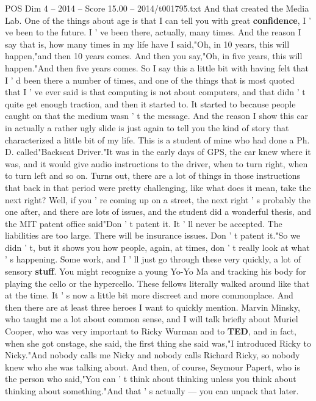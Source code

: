 \begin{textsample}{POS Dim 4 – 2014 – Score 15.00 – 2014/t001795.txt}
And that created the Media Lab.
One of the things about age is that I can tell you with great \textbf{confidence}, I ' ve been to the future.
I ' ve been there, actually, many times.
And the reason I say that is, how many times in my life have I said,"Oh, in 10 years, this will happen,"and then 10 years comes.
And then you say,"Oh, in five years, this will happen."And then five years comes.
So I say this a little bit with having felt that I ' d been there a number of times, and one of the things that is most quoted that I ' ve ever said is that computing is not about computers, and that didn ' t quite get enough traction, and then it started to.
It started to because people caught on that the medium wasn ' t the message.
And the reason I show this car in actually a rather ugly slide is just again to tell you the kind of story that characterized a little bit of my life.
This is a student of mine who had done a Ph.
D. called"Backseat Driver."It was in the early days of GPS, the car knew where it was, and it would give audio instructions to the driver, when to turn right, when to turn left and so on.
Turns out, there are a lot of things in those instructions that back in that period were pretty challenging, like what does it mean, take the next right?
Well, if you ' re coming up on a street, the next right ' s probably the one after, and there are lots of issues, and the student did a wonderful thesis, and the MIT patent office said"Don ' t patent it.
It ' ll never be accepted.
The liabilities are too large.
There will be insurance issues.
Don ' t patent it."So we didn ' t, but it shows you how people, again, at times, don ' t really look at what ' s happening.
Some work, and I ' ll just go through these very quickly, a lot of sensory \textbf{stuff}.
You might recognize a young Yo-Yo Ma and tracking his body for playing the cello or the hypercello.
These fellows literally walked around like that at the time.
It ' s now a little bit more discreet and more commonplace.
And then there are at least three heroes I want to quickly mention.
Marvin Minsky, who taught me a lot about common sense, and I will talk briefly about Muriel Cooper, who was very important to Ricky Wurman and to \textbf{TED}, and in fact, when she got onstage, she said, the first thing she said was,"I introduced Ricky to Nicky."And nobody calls me Nicky and nobody calls Richard Ricky, so nobody knew who she was talking about.
And then, of course, Seymour Papert, who is the person who said,"You can ' t think about thinking unless you think about thinking about something."And that ' s actually — you can unpack that later.

\end{textsample}
